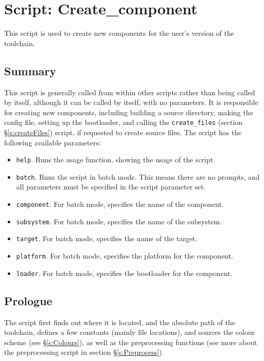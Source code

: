 \documentclass[a4paper, oneside, 11pt, titlepage, onecolumn, openright]{report}
\begin{document}
\section{Script: Create\_component}
			\label{s:createComponent}
			This script is used to create new components for the user's version of the toolchain.
			
\subsection{Summary}
			\label{ss:crecompSummary}
			This script is generally called from within other scripts rather than being called by itself, although it can be called by itself, with no parameters. It is responsible for creating new components, including building a source directory, making the config file, setting up the bootloader, and calling the \texttt{create\_files} (section \S\ref{s:createFiles}) script, if requested to create source files.
			The script has the following available parameters:
			
\begin{itemize}
\item \texttt{help}. Runs the usage function, showing the usage of the script.
\item \texttt{batch}. Runs the script in batch mode. This means there are no prompts, and all parameters must be specified in the script parameter set.
\item \texttt{component}. For batch mode, specifies the name of the component.
\item \texttt{subsystem}. For batch mode, specifies the name of the subsystem.
\item \texttt{target}. For batch mode, specifies the name of the target.
\item \texttt{platform}. For batch mode, specifies the platform for the component.
\item \texttt{loader}. For batch mode, specifies the bootloader for the component.
\end{itemize}
			
\subsection{Prologue}
			\label{ss:crecompPrologue}
			The script first finds out where it is located, and the absolute path of the toolchain, defines a few constants (mainly file locations), and sources the colour scheme (see \S\ref{s:Colours}), as well as the preprocessing functions (see more about the preprocessing script in section \S\ref{s:Preprocess})
			
\end{document}
